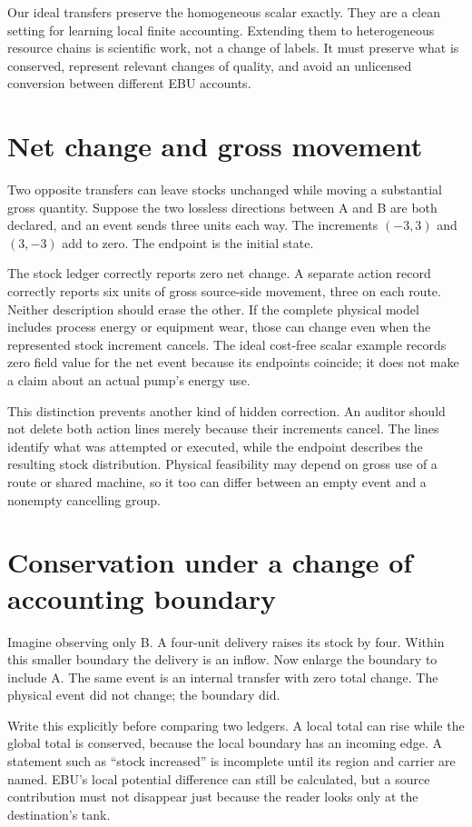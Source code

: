 Our ideal transfers preserve the homogeneous scalar exactly. They are a clean setting for learning local finite accounting. Extending them to heterogeneous resource chains is scientific work, not a change of labels. It must preserve what is conserved, represent relevant changes of quality, and avoid an unlicensed conversion between different EBU accounts.

\section{Net change and gross movement}
Two opposite transfers can leave stocks unchanged while moving a substantial gross quantity. Suppose the two lossless directions between A and B are both declared, and an event sends three units each way. The increments \((-3,3)\) and \((3,-3)\) add to zero. The endpoint is the initial state.

The stock ledger correctly reports zero net change. A separate action record correctly reports six units of gross source-side movement, three on each route. Neither description should erase the other. If the complete physical model includes process energy or equipment wear, those can change even when the represented stock increment cancels. The ideal cost-free scalar example records zero field value for the net event because its endpoints coincide; it does not make a claim about an actual pump's energy use.

This distinction prevents another kind of hidden correction. An auditor should not delete both action lines merely because their increments cancel. The lines identify what was attempted or executed, while the endpoint describes the resulting stock distribution. Physical feasibility may depend on gross use of a route or shared machine, so it too can differ between an empty event and a nonempty cancelling group.

\section{Conservation under a change of accounting boundary}
Imagine observing only B. A four-unit delivery raises its stock by four. Within this smaller boundary the delivery is an inflow. Now enlarge the boundary to include A. The same event is an internal transfer with zero total change. The physical event did not change; the boundary did.

Write this explicitly before comparing two ledgers. A local total can rise while the global total is conserved, because the local boundary has an incoming edge. A statement such as ``stock increased'' is incomplete until its region and carrier are named. EBU's local potential difference can still be calculated, but a source contribution must not disappear just because the reader looks only at the destination's tank.


